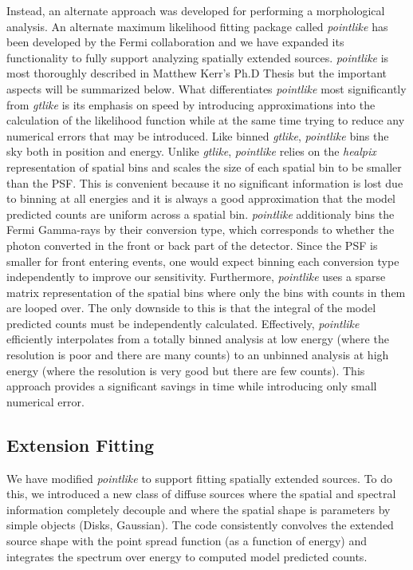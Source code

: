 \documentclass[preprint]{aastex}
\newcommand{\pointlike}{{\em pointlike}\xspace}
\newcommand{\gtlike}{{\em gtlike}\xspace}
\begin{document}
Instead, an alternate approach was developed for performing
a morphological analysis. An alternate maximum likelihood fitting
package called \pointlike has been developed by the Fermi
collaboration and we have expanded its functionality to fully support
analyzing spatially extended sources. \pointlike is most thoroughly
described in Matthew Kerr's Ph.D Thesis\cite{Matthew_kerr_phd_thesis}
but the important aspects will be summarized below. What differentiates
\pointlike most significantly from \gtlike is its emphasis
on speed by introducing approximations into the calculation of the
likelihood function while at the same time trying to reduce any
numerical errors that may be introduced.  Like binned \gtlike,
\pointlike bins the sky both in position and energy.  Unlike 
\gtlike, \pointlike relies on the {\em healpix} representation of spatial
bins\cite{healpix_paper} and scales the size of each spatial bin to be
smaller than the PSF. This is convenient because it no
significant information is lost due to binning at all energies and it is
always a good approximation that the model predicted counts are uniform
across a spatial bin. 
\pointlike additionaly bins the Fermi Gamma-rays by their conversion type,
which corresponds to whether the photon converted in the front or back
part of the detector. Since the PSF is smaller for front entering events,
one would expect binning each conversion type independently to improve
our sensitivity.
Furthermore, \pointlike uses a sparse matrix
representation of the spatial bins where only the bins with counts in them
are looped over. The only downside to this is that the integral of the
model predicted counts must be independently calculated.  Effectively,
\pointlike efficiently interpolates from a totally binned analysis
at low energy (where the resolution is poor and there are many counts)
to an unbinned analysis at high energy (where the resolution is very
good but there are few counts). This approach provides a significant
savings in time while introducing only small numerical error.



\subsection{Extension Fitting}

We have modified \pointlike to support fitting spatially extended
sources.  To do this, we introduced a new class of diffuse sources where
the spatial and spectral information completely decouple and where
the spatial shape is parameters by simple objects (Disks, Gaussian).
The code consistently convolves the extended source shape with the point
spread function (as a function of energy) and integrates the spectrum over energy
to computed model predicted counts.
\end{document}
